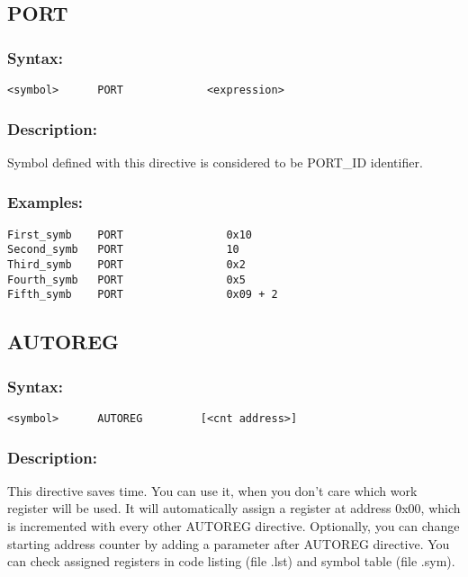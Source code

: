     \subsection{PORT}
        \subsubsection{Syntax:}
        {
            \usecodefont
            \verb'<symbol>      PORT             <expression>'
        }

        \subsubsection{Description:}
            Symbol defined with this directive is considered to be PORT\_ID identifier.

        \subsubsection{Examples:}
        {
            \usecodefont
            \verb'First_symb    PORT                0x10    '\\
            \verb'Second_symb   PORT                10      '\\
            \verb'Third_symb    PORT                0x2     '\\
            \verb'Fourth_symb   PORT                0x5     '\\
            \verb'Fifth_symb    PORT                0x09 + 2'\\
        }

    \subsection{AUTOREG}
        \subsubsection{Syntax:}
        {
            \usecodefont
            \verb'<symbol>      AUTOREG         [<cnt address>]'
        }

        \subsubsection{Description:}
            This directive saves time. You can use it, when you don't care which work register will be used. It will automatically assign a register at address 0x00, which is incremented with every other AUTOREG directive. Optionally, you can change starting address counter by adding a parameter after AUTOREG directive. You can check assigned registers in code listing (file .lst) and symbol table (file .sym).

